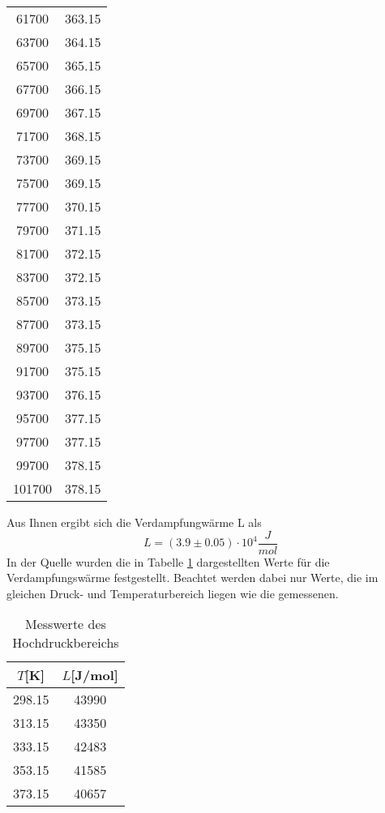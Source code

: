 \begin{table}[H]
\begin{tabular}{c c}
      61700 &   363.15 \\ 
      63700 &   364.15 \\ 
      65700 &   365.15 \\ 
      67700 &   366.15 \\ 
      69700 &   367.15 \\ 
      71700 &   368.15 \\ 
      73700 &   369.15 \\ 
      75700 &   369.15 \\ 
      77700 &   370.15 \\ 
      79700 &   371.15 \\ 
      81700 &   372.15 \\ 
      83700 &   372.15 \\ 
      85700 &   373.15 \\ 
      87700 &   373.15 \\
      89700 &   375.15 \\ 
      91700 &   375.15 \\ 
      93700 &   376.15 \\ 
      95700 &   377.15 \\ 
      97700 &   377.15 \\ 
      99700 &   378.15 \\ 
      101700 &   378.15 \\ 
    \bottomrule
    \end{tabular}
\end{table}
\noindent Aus Ihnen ergibt sich die Verdampfungwärme L als 
\begin{equation*}
    L= (3.9 \pm 0.05) \cdot 10^4 \dfrac{J}{mol}
\end{equation*}
\noindent In der Quelle \cite{Verdampfungwärme} wurden die in Tabelle \ref{tab:ndrtheo} dargestellten Werte
für die Verdampfungswärme festgestellt. Beachtet werden dabei nur Werte, die im gleichen 
Druck- und Temperaturbereich liegen wie die gemessenen.
\begin{table}[H]
\centering
   \caption{Messwerte des Hochdruckbereichs}
   \label{tab:ndrtheo}
   \begin{tabular}{c c}
   \toprule
    $T$[K] & $L$[J/mol] \\
    \midrule
    298.15 &    43990 \\ 
    313.15 &    43350 \\   
    333.15 &    42483 \\   
    353.15 &    41585 \\   
    373.15 &    40657 \\   
    \bottomrule
    \end{tabular}
\end{table}
